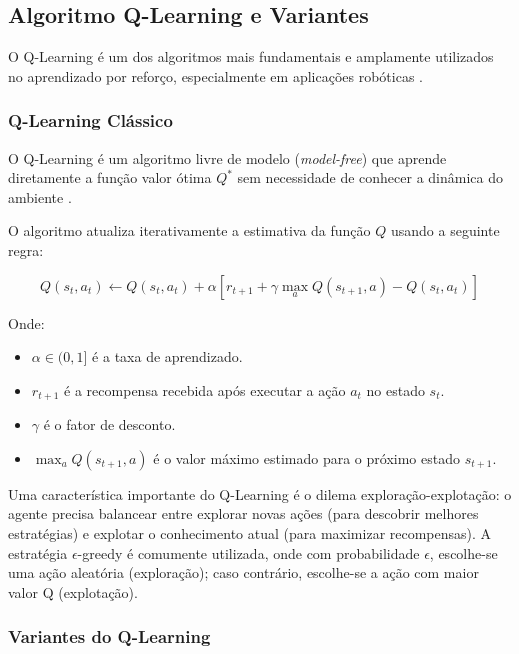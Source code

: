 \subsection{Algoritmo Q-Learning e Variantes}

O Q-Learning é um dos algoritmos mais fundamentais e amplamente utilizados no aprendizado por reforço, especialmente em aplicações robóticas \cite{Watkins1992}.

\subsubsection{Q-Learning Clássico}

O Q-Learning é um algoritmo livre de modelo (\textit{model-free}) que aprende diretamente a função valor ótima $Q^*$ sem necessidade de conhecer a dinâmica do ambiente \cite{Watkins1992}.

O algoritmo atualiza iterativamente a estimativa da função $Q$ usando a seguinte regra:

\begin{equation}
Q(s_t, a_t) \leftarrow Q(s_t, a_t) + \alpha [r_{t+1} + \gamma \max_{a} Q(s_{t+1}, a) - Q(s_t, a_t)]
\end{equation}

Onde:
\begin{itemize}
    \item $\alpha \in (0, 1]$ é a taxa de aprendizado.
    \item $r_{t+1}$ é a recompensa recebida após executar a ação $a_t$ no estado $s_t$.
    \item $\gamma$ é o fator de desconto.
    \item $\max_{a} Q(s_{t+1}, a)$ é o valor máximo estimado para o próximo estado $s_{t+1}$.
\end{itemize}

Uma característica importante do Q-Learning é o dilema exploração-explotação: o agente precisa balancear entre explorar novas ações (para descobrir melhores estratégias) e explotar o conhecimento atual (para maximizar recompensas). A estratégia $\epsilon$-greedy é comumente utilizada, onde com probabilidade $\epsilon$, escolhe-se uma ação aleatória (exploração); caso contrário, escolhe-se a ação com maior valor Q (explotação).

\subsubsection{Variantes do Q-Learning}

